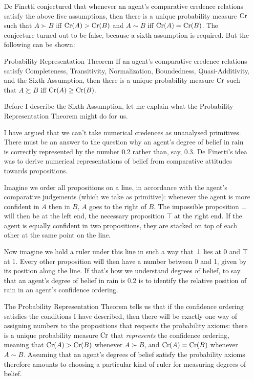 De Finetti conjectured that whenever an agent's comparative credence
relations satisfy the above five assumptions, then there is a unique
probability measure $\text{Cr}$ such that $A \succ B$ iff $\text{Cr}(A) > \text{Cr}(B)$
and $A \sim B$ iff $\text{Cr}(A) = \text{Cr}(B)$. The conjecture turned out to be
false, because a sixth assumption is required. But the following can
be shown:
%
\begin{genericthm}{Probability Representation Theorem}
  If an agent's comparative credence relations satisfy Completeness,
  Transitivity, Normalization, Boundedness, Quasi-Additivity, and the
  Sixth Assumption, then there is a unique probability measure $\text{Cr}$
  such that $A \succsim B$ iff $\text{Cr}(A) \geq \text{Cr}(B)$.
\end{genericthm}
%
Before I describe the Sixth Assumption, let me explain what the
Probability Representation Theorem might do for us.

I have argued that we can't take numerical credences as unanalysed
primitives. There must be an answer to the question why an agent's
degree of belief in rain is correctly represented by the number 0.2
rather than, say, 0.3. De Finetti's idea was to derive numerical
representations of belief from comparative attitudes towards
propositions.

Imagine we order all propositions on a line, in accordance with the
agent's comparative judgements (which we take as primitive): whenever
the agent is more confident in $A$ then in $B$, $A$ goes to the right
of $B$. The impossible proposition $\bot$ will then be at the left
end, the necessary proposition $\top$ at the right end. If the agent
is equally confident in two propositions, they are stacked on top of
each other at the same point on the line.

Now imagine we hold a ruler under this line in such a way that $\bot$
lies at 0 and $\top$ at 1. Every other proposition will then have a
number between 0 and 1, given by its position along the line. If
that's how we understand degrees of belief, to say that an agent's
degree of belief in rain is 0.2 is to identify the relative position
of rain in an agent's confidence ordering.

The Probability Representation Theorem tells us that if the confidence
ordering satisfies the conditions I have described, then there will be
exactly one way of assigning numbers to the propositions that respects
the probability axioms: there is a unique probability measure $\text{Cr}$
that \emph{represents} the confidence ordering, meaning that
$\text{Cr}(A) > \text{Cr}(B)$ whenever $A \succ B$, and $\text{Cr}(A) = \text{Cr}(B)$ whenever
$A \sim B$. Assuming that an agent's degrees of belief satisfy the
probability axioms therefore amounts to choosing a particular kind of
ruler for measuring degrees of belief.

